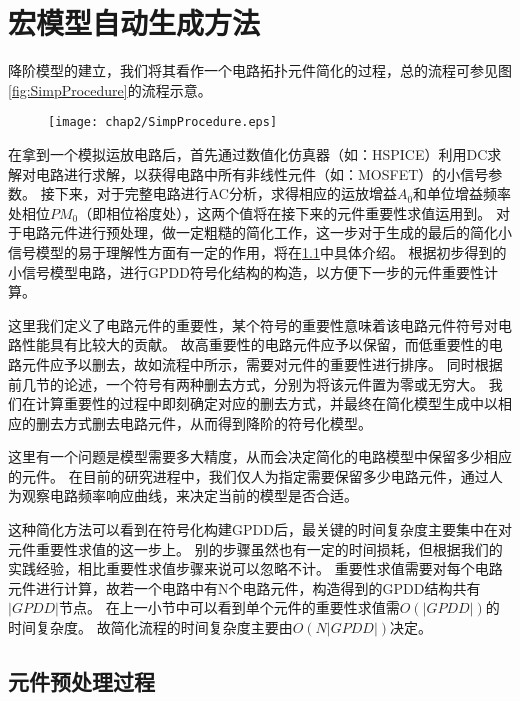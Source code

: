 \section{宏模型自动生成方法}
\label{subsec:simp:alg:top}

降阶模型的建立，我们将其看作一个电路拓扑元件简化的过程，总的流程可参见图\ref{fig:SimpProcedure}的流程示意。

\begin{figure}[!htp]
	\centering
	\texttt{[image: chap2/SimpProcedure.eps]}
\end{figure}

在拿到一个模拟运放电路后，首先通过数值化仿真器（如：HSPICE）利用DC求解对电路进行求解，以获得电路中所有非线性元件（如：MOSFET）的小信号参数。
接下来，对于完整电路进行AC分析，求得相应的运放增益$A_0$和单位增益频率处相位$PM_0$（即相位裕度处），这两个值将在接下来的元件重要性求值运用到。
对于电路元件进行预处理，做一定粗糙的简化工作，这一步对于生成的最后的简化小信号模型的易于理解性方面有一定的作用，将在\ref{subsec:simp:alg:pre}中具体介绍。
根据初步得到的小信号模型电路，进行GPDD符号化结构的构造，以方便下一步的元件重要性计算。

这里我们定义了电路元件的重要性，某个符号的重要性意味着该电路元件符号对电路性能具有比较大的贡献。
故高重要性的电路元件应予以保留，而低重要性的电路元件应予以删去，故如流程中所示，需要对元件的重要性进行排序。
同时根据前几节的论述，一个符号有两种删去方式，分别为将该元件置为零或无穷大。
我们在计算重要性的过程中即刻确定对应的删去方式，并最终在简化模型生成中以相应的删去方式删去电路元件，从而得到降阶的符号化模型。

这里有一个问题是模型需要多大精度，从而会决定简化的电路模型中保留多少相应的元件。
在目前的研究进程中，我们仅人为指定需要保留多少电路元件，通过人为观察电路频率响应曲线，来决定当前的模型是否合适。

这种简化方法可以看到在符号化构建GPDD后，最关键的时间复杂度主要集中在对元件重要性求值的这一步上。
别的步骤虽然也有一定的时间损耗，但根据我们的实践经验，相比重要性求值步骤来说可以忽略不计。
重要性求值需要对每个电路元件进行计算，故若一个电路中有N个电路元件，构造得到的GPDD结构共有$\left|GPDD\right|$节点。
在上一小节中可以看到单个元件的重要性求值需$O\left(\left|GPDD\right|\right)$的时间复杂度。
故简化流程的时间复杂度主要由$O\left(N\left|GPDD\right|\right)$决定。

\subsection{元件预处理过程}
\label{subsec:simp:alg:pre}

